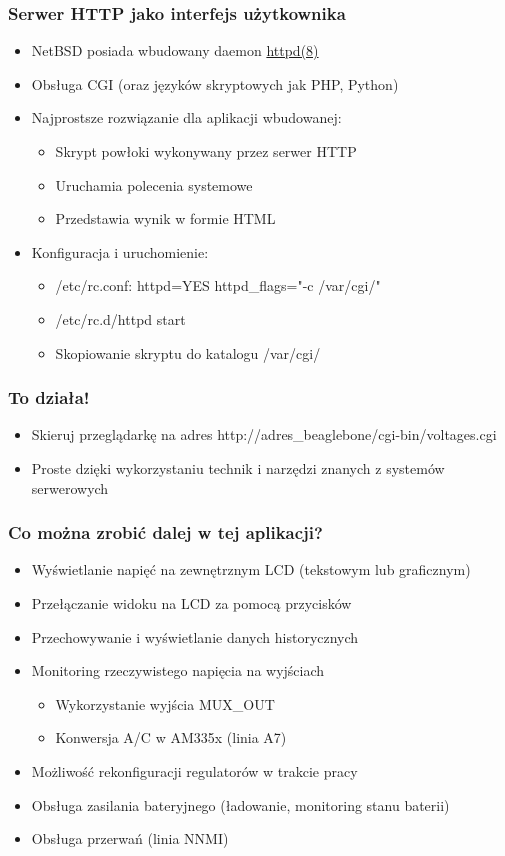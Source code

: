 \documentclass[dvipsnames,table]{beamer}
\begin{document}
\begin{frame}[fragile]
\frametitle{Serwer HTTP jako interfejs użytkownika}
\begin{itemize}
	\item NetBSD posiada wbudowany daemon \href{http://netbsd.gw.com/cgi-bin/man-cgi?httpd++NetBSD-current}{httpd(8)}
	\item Obsługa CGI (oraz języków skryptowych jak PHP, Python)	
	\item Najprostsze rozwiązanie dla aplikacji wbudowanej:
	\begin{itemize}
		\item Skrypt powłoki wykonywany przez serwer HTTP
		\item Uruchamia polecenia systemowe
		\item Przedstawia wynik w formie HTML
	\end{itemize}
	\item Konfiguracja i uruchomienie:
	\begin{itemize}
		\item /etc/rc.conf: httpd=YES httpd\_flags="-c /var/cgi/"
		\item /etc/rc.d/httpd start
		\item Skopiowanie skryptu do katalogu /var/cgi/
	\end{itemize}

\end{itemize}
\lstCGI
\end{frame}

\begin{frame}
\frametitle{To działa!}
\begin{itemize}
	\item Skieruj przeglądarkę na adres http://adres\_beaglebone/cgi-bin/voltages.cgi
	\item Proste dzięki wykorzystaniu technik i narzędzi znanych z systemów serwerowych
\end{itemize}
\end{frame}

\begin{frame}
\frametitle{Co można zrobić dalej w tej aplikacji?}
\begin{itemize}
	\item Wyświetlanie napięć na zewnętrznym LCD (tekstowym lub graficznym)
	\item Przełączanie widoku na LCD za pomocą przycisków
	\item Przechowywanie i wyświetlanie danych historycznych
	\item Monitoring rzeczywistego napięcia na wyjściach
	\begin{itemize}
		\item Wykorzystanie wyjścia MUX\_OUT
		\item Konwersja A/C w AM335x (linia A7)
	\end{itemize}
	\item Możliwość rekonfiguracji regulatorów w trakcie pracy
	\item Obsługa zasilania bateryjnego (ładowanie, monitoring stanu baterii)
	\item Obsługa przerwań (linia NNMI)
\end{itemize}
\end{frame}
\end{document}

